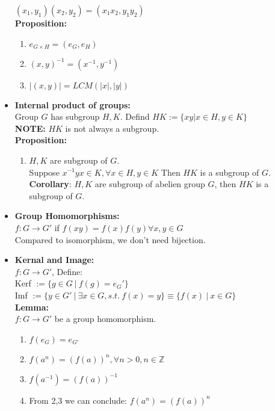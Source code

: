 \documentclass[12pt]{article}
\begin{document}
\begin{itemize}
        $(x_1,y_1)(x_2, y_2) = (x_1x_2, y_1y_2)$\\
        \textbf{Proposition:}
        \begin{enumerate}
            \item $e_{G\times H} = (e_G, e_H)$
            \item $(x,y)^{-1} = (x^{-1}, y^{-1})$
            \item $|(x,y)| = LCM(|x|, |y|)$
        \end{enumerate}
        \item \textbf{Internal product of groups:}\\
        Group $G$ has subgroup $H, K$. Defind $HK:=\{xy | x\in H, y \in K\}$\\
        \textbf{NOTE:} $HK$ is not always a subgroup.\\
        \textbf{Proposition:}
        \begin{enumerate}
            \item $H,K$ are subgroup of $G$. \\
            Suppose $x^{-1}yx\in K, \forall x\in H, y \in K$ Then $HK$ is a subgroup of $G$.\\
            \textbf{Corollary}: $H,K$ are subgroup of abelien group $G$, then $HK$ is a subgroup of $G$.
        \end{enumerate}
        \item \textbf{Group Homomorphisms:}\\
        $f: G \rightarrow G'$ if $f(xy) = f(x)f(y) \forall x,y \in G$\\
        Compared to isomorphism, we don't need bijection.
        \item \textbf{Kernal and Image:}\\
        $f: G \rightarrow G'$, Define:\\
        Kerf $:=\{g \in G \ | \ f(g) = e_G'\}$\\
        Imf $:= \{y \in G' \ | \ \exists x \in G, s.t. \ f(x) = y\} \equiv \{f(x) \ | \ x\in G\}$\\
        \textbf{Lemma:}\\
        $f: G \rightarrow G'$ be a group homomorphism.
        \begin{enumerate}
            \item $f(e_G) = e_{G'}$
            \item $f(a^n) = (f(a))^n, \forall n >0, n \in \mathbb{Z}$
            \item $f(a^{-1}) = (f(a))^{-1}$
            \item From 2,3 we can conclude: $f(a^n) = (f(a))^n$

\end{enumerate}
\end{itemize}
\end{document}
